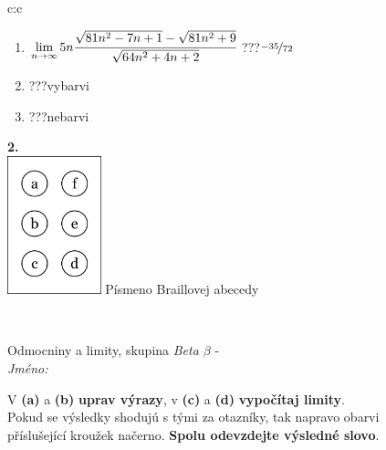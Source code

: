 \documentclass[10pt]{report}
\begin{document}
\begin{tabular}{c:c}
\begin{minipage}[c][104.5mm][t]{0.5\linewidth}
\begin{center}
\begin{minipage}{0.79\linewidth}
\begin{center}
\begin{varwidth}{\linewidth}
\begin{enumerate}
\item $\lim\limits_{n\to\infty}5n\cfrac{\sqrt{81n^2-7n+1}-\sqrt{81n^2+9}}{\sqrt{64n^2+4n+2}}$\quad \dotfill\; ???\;\dotfill \quad $\nicefrac{-35}{72}$
\item \quad \dotfill\; ???\;\dotfill \quad vybarvi
\item \quad \dotfill\; ???\;\dotfill \quad nebarvi
\end{enumerate}
\end{varwidth}
\end{center}
\end{minipage}
\begin{minipage}{0.20\linewidth}
\begin{center}
{\Huge\bfseries 2.} \\[2mm]
\includegraphics[height=40mm]{../images/braille.png}
{\small Písmeno Braillovej abecedy}
\end{center}
\end{minipage}
\end{center}
\end{minipage}
\\ \hdashline
\begin{minipage}[c][104.5mm][t]{0.5\linewidth}
\begin{center}
\vspace{7mm}
{\huge Odmocniny a limity, skupina \textit{Beta $\beta$} -}\\[5mm]
\textit{Jméno:}\phantom{xxxxxxxxxxxxxxxxxxxxxxxxxxxxxxxxxxxxxxxxxxxxxxxxxxxxxxxxxxxxxxxxx}\\[5mm]
\begin{minipage}{0.95\linewidth}
\begin{center}
V \textbf{(a)} a \textbf{(b)} \textbf{uprav výrazy}, v \textbf{(c)} a \textbf{(d)} \textbf{vypočítaj limity}.\\Pokud se výsledky shodujú s tými za otazníky, tak napravo obarvi\\příslušející kroužek načerno. \textbf{Spolu odevzdejte výsledné slovo}.
\end{center}
\end{minipage}
\\[1mm]

\end{center}
\end{minipage}
\end{tabular}
\end{document}
